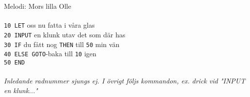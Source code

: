 Melodi: Mors lilla Olle\\
\\
\texttt{10 LET} oss nu fatta i våra glas\\
\texttt{20 INPUT} en klunk utav det som där has\\
\texttt{30 IF} du fått nog \texttt{THEN} till \texttt{50} min vän\\
\texttt{40 ELSE GOTO}-baka till \texttt{10} igen\\
\texttt{50 END}\\
\\
{\footnotesize\textit{Inledande radnummer sjungs ej. I övrigt följs kommandon, ex. drick vid "INPUT en klunk..."}}
